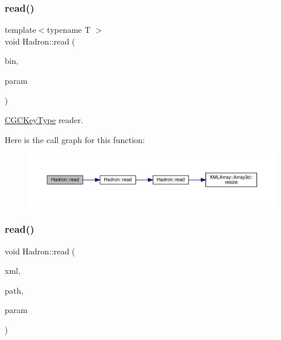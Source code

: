 \subsubsection{\texorpdfstring{read()}{read()}\hspace{0.1cm}{\footnotesize\ttfamily [9/94]}}
{\footnotesize\ttfamily template$<$typename T $>$ \\
void Hadron\+::read (\begin{DoxyParamCaption}\item[{\mbox{\hyperlink{classADATIO_1_1BinaryReader}{Binary\+Reader}} \&}]{bin,  }\item[{\mbox{\hyperlink{structHadron_1_1CGCKeyType}{C\+G\+C\+Key\+Type}}$<$ T $>$ \&}]{param }\end{DoxyParamCaption})\hspace{0.3cm}{\ttfamily [inline]}}



\mbox{\hyperlink{structHadron_1_1CGCKeyType}{C\+G\+C\+Key\+Type}} reader. 

Here is the call graph for this function\+:\nopagebreak
\begin{figure}[H]
\begin{center}
\leavevmode
\includegraphics[width=350pt]{d1/daf/namespaceHadron_af29a7ca56e3472207899938a2a50babe_cgraph}
\end{center}
\end{figure}
\mbox{\label{namespaceHadron_a4cc74936761dd0dad429189f523b1432}} 
\subsubsection{\texorpdfstring{read()}{read()}\hspace{0.1cm}{\footnotesize\ttfamily [10/94]}}
{\footnotesize\ttfamily void Hadron\+::read (\begin{DoxyParamCaption}\item[{\mbox{\hyperlink{classADATXML_1_1XMLReader}{X\+M\+L\+Reader}} \&}]{xml,  }\item[{const std\+::string \&}]{path,  }\item[{\mbox{\hyperlink{structHadron_1_1KeyHadronSUNNPartIrrep__t}{Key\+Hadron\+S\+U\+N\+N\+Part\+Irrep\+\_\+t}} \&}]{param }\end{DoxyParamCaption})}



